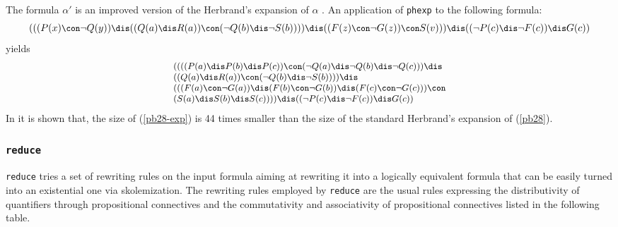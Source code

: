 The formula $\alpha'$ is an improved version of the Herbrand's expansion
of $\alpha$ \cite{dreben1}.
An application of {\tt phexp} to the following formula:
\begin{equation}\label{pb28}\small
    (((P(x) \con \neg Q(y)) \dis
     ((Q(a) \dis R(a)) \con (\neg Q(b) \dis \neg S(b)))) \dis
     ((F(z) \con \neg G(z)) \con S(v))) \dis
       ((\neg P(c) \dis \neg F(c)) \dis G(c))
\end{equation}
yields
\begin{equation}\label{pb28-exp}\small
\begin{array}{l}
((((P(a) \dis P(b) \dis P(c)) \con (\neg Q(a) \dis \neg Q(b) \dis
\neg Q(c)))\dis\\
((Q(a) \dis R(a)) \con (\neg Q(b) \dis \neg S(b)))) \dis \\
(((F(a) \con \neg G(a)) \dis (F(b) \con \neg G(b)) \dis
(F(c) \con \neg G(c)))\con\\
(S(a) \dis S(b) \dis S(c)))) \dis ((\neg P(c) \dis \neg F(c)) \dis G(c))\\
\end{array}
\end{equation}
In \cite{armando5} it is shown that, the size of (\ref{pb28-exp})
is 44 times smaller than the size of the standard Herbrand's expansion of
(\ref{pb28}).

\subsubsection*{{\tt reduce}}
{\tt reduce} tries a set of rewriting rules on the input
formula aiming at rewriting it into a logically equivalent formula that
can be easily turned into an existential one via skolemization.
The rewriting rules employed by {\tt reduce} are the usual rules
expressing the distributivity of quantifiers through propositional connectives
and the commutativity and associativity of propositional connectives
listed in the following table.\\

